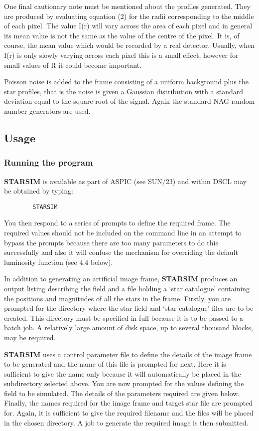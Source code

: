 One final cautionary note must be mentioned about the profiles generated.
They are produced by evaluating equation (2) for the radii corresponding to the
middle of each pixel.
The value I(r) will vary across the area of each pixel and in general its mean
value is not the same as the value of the centre of the pixel.
It is, of course, the mean value which would be recorded by a real detector.
Usually, when I(r) is only slowly varying across each pixel this is a small
effect, however for small values of R it could become important.

Poisson noise is added to the frame consisting of a uniform background plus the
star profiles, that is the noise is given a Gaussian distribution with a
standard deviation equal to the square root of the signal.
Again the standard NAG random number generators are used.
\subsection {Usage}
\subsubsection {Running the program}
{\bf STARSIM} is available as part of ASPIC (see SUN/23) and within DSCL may be
obtained by typing:
\begin{verbatim}
        STARSIM
\end{verbatim}
You then respond to a series of prompts to define the required frame.
The required values should not be included on the command line in an attempt to
bypass the prompts because there are too many parameters to do this successfully
and also it will confuse the mechanism for overriding the default luminosity
function (see 4.4 below).

In addition to generating an artificial image frame, {\bf STARSIM} produces an
output listing describing the field and a file holding a `star catalogue'
containing the positions and magnitudes of all the stars in the frame.
Firstly, you are prompted for the directory where the star field and `star
catalogue' files are to be created.
This directory must be specified in full because it is to be passed to a batch
job.
A relatively large amount of disk space, up to several thousand blocks, may be
required.

{\bf STARSIM} uses a control parameter file to define the details of the image
frame to be generated and the name of this file is prompted for next.
Here it is sufficient to give the name only because it will automatically be
placed in the subdirectory selected above.
You are now prompted for the values defining the field to be simulated.
The details of the parameters required are given below.
Finally, the names required for the image frame and target star file are
prompted for.
Again, it is sufficient to give the required filename and the files will be
placed in the chosen directory.
A job to generate the required image is then submitted.

